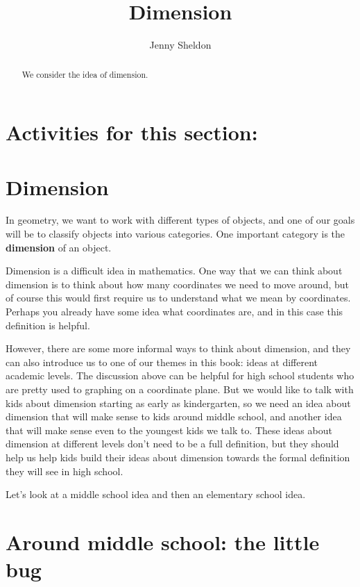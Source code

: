 \documentclass{ximera}
\title{Dimension}
\author{Jenny Sheldon}
\begin{document}
\begin{abstract}
We consider the idea of dimension.
\end{abstract}
\maketitle

\section{Activities for this section:} 

\section{Dimension}

In geometry, we want to work with different types of objects, and one of our goals will be to classify objects into various categories. One important category is the {\bf dimension} of an object.

Dimension is a difficult idea in mathematics. One way that we can think about dimension is to think about how many coordinates we need to move around, but of course this would first require us to understand what we mean by coordinates. Perhaps you already have some idea what coordinates are, and in this case this definition is helpful.

However, there are some more informal ways to think about dimension, and they can also introduce us to one of our themes in this book: ideas at different academic levels. The discussion above can be helpful for high school students who are pretty used to graphing on a coordinate plane. But we would like to talk with kids about dimension starting as early as kindergarten, so we need an idea about dimension that will make sense to kids around middle school, and another idea that will make sense even to the youngest kids we talk to. These ideas about dimension at different levels don't need to be a full definition, but they should help us help kids build their ideas about dimension towards the formal definition they will see in high school. 

Let's look at a middle school idea and then an elementary school idea.

\section{Around middle school: the little bug}
\end{document}
